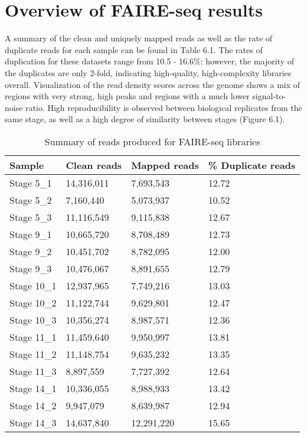 \section{Overview of FAIRE-seq results}
A summary of the clean and uniquely mapped reads as well as the rate of duplicate reads for each sample can be found in Table 6.1. The rates of duplication for these datasets range from 10.5 - 16.6\%; however, the majority of the duplicates are only 2-fold, indicating high-quality, high-complexity libraries overall. Visualization of the read density scores across the genome shows a mix of regions with very strong, high peaks and regions with a much lower signal-to-noise ratio. High reproducibility is observed between biological replicates from the same stage, as well as a high degree of similarity between stages (Figure 6.1).

\begin{table}[h]
\centering
\begin{tabular}{|l|l|l|l|}
\hline
\textbf{Sample}      & \textbf{Clean reads} & \textbf{Mapped reads} & \textbf{\% Duplicate reads} \\ \hline
Stage 5\_1  & 14,316,011    & 7,693,543      & 12.72              \\ \hline
Stage 5\_2  & 7,160,440     & 5,073,937      & 10.52              \\ \hline
Stage 5\_3  & 11,116,549    & 9,115,838      & 12.67              \\ \hline
Stage 9\_1  & 10,665,720    & 8,708,489      & 12.73              \\ \hline
Stage 9\_2  & 10,451,702    & 8,782,095      & 12.00               \\ \hline
Stage 9\_3  & 10,476,067    & 8,891,655      & 12.79              \\ \hline
Stage 10\_1 & 12,937,965    & 7,749,216      & 13.03              \\ \hline
Stage 10\_2 & 11,122,744    & 9,629,801      & 12.47              \\ \hline
Stage 10\_3 & 10,356,274    & 8,987,571      & 12.36              \\ \hline
Stage 11\_1 & 11,459,640    & 9,950,997      & 13.81              \\ \hline
Stage 11\_2 & 11,148,754    & 9,635,232      & 13.35              \\ \hline
Stage 11\_3 & 8,897,559     & 7,727,392      & 12.64              \\ \hline
Stage 14\_1 & 10,336,055    & 8,988,933      & 13.42              \\ \hline
Stage 14\_2 & 9,947,079     & 8,639,987      & 12.94              \\ \hline
Stage 14\_3 & 14,637,840    & 12,291,220     & 15.65              \\  \hline
\end{tabular}
\caption{Summary of reads produced for FAIRE-seq libraries}
\label{Table 6.1}
\end{table}

